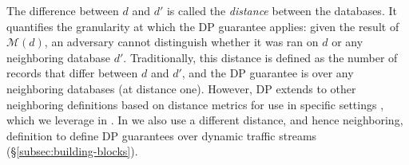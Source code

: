 The difference between $d$ and $d'$ is called the {\em distance} between the
databases.
It quantifies the granularity at which the DP guarantee applies: given the
result of $\mathcal{M}(d)$, an adversary cannot distinguish whether it was ran
on $d$ or any neighboring database $d'$.
Traditionally, this distance is defined as the number of records that differ
between $d$ and $d'$, and the DP guarantee is over any neighboring databases (at
distance one).
However, DP extends to other neighboring definitions based on distance metrics
for use in specific settings \cite{chatzikokolakis2013broadening,
lecuyer2019certified}, which we leverage in \sys.
In {\sys} we also use a different distance, and hence neighboring, definition to
define DP guarantees over dynamic traffic streams
(\S\ref{subsec:building-blocks}).

\fi

